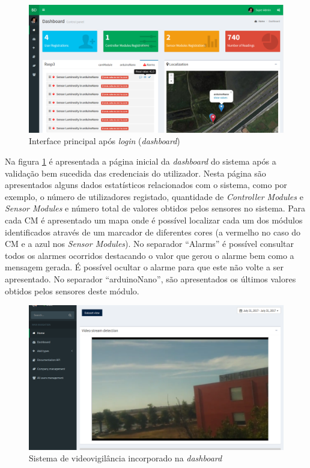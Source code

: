 \newpage

\begin{figure}[h]
	\centering
	\includegraphics[width=0.94\linewidth]{prints-web/dashboard1.png}
	\caption{Interface principal após \textit{login} (\textit{dashboard})}
	\label{ddashboard}
\end{figure}




Na figura \ref{ddashboard} é apresentada a página inicial da \textit{dashboard} do sistema após a validação bem sucedida das credenciais do utilizador. Nesta página são apresentados alguns dados estatísticos relacionados com o sistema, como por exemplo, o número de utilizadores registado, quantidade de \textit{Controller Modules} e \textit{Sensor Modules} e número total de valores obtidos pelos sensores no sistema. Para cada \acl{CM} é apresentado um mapa onde é possível localizar cada um dos módulos identificados através de um marcador de diferentes cores (a vermelho no caso do \acl{CM} e a azul nos \textit{Sensor Modules}). No separador ``Alarms''  é possível consultar todos os alarmes ocorridos destacando o valor que gerou o alarme bem como a mensagem gerada. É possível ocultar o alarme para que este não volte a ser apresentado. No separador ``arduinoNano'', são apresentados os últimos valores obtidos pelos sensores deste módulo. 


\begin{figure}[h]
	\centering
	\includegraphics[width=0.7\linewidth]{prints-web/stream.png}
	\caption{Sistema de videovigilância incorporado na \textit{dashboard}}
	\label{vigilancia}
\end{figure}







